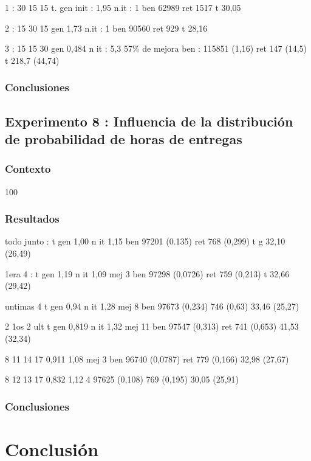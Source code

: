\documentclass{article}
\begin{document}
1 : 30 15 15
t. gen init : 1,95
n.it : 1
ben 62989
ret 1517
t 30,05

2 : 15 30 15
gen 1,73
n.it : 1
ben 90560
ret 929
t 28,16

3 : 15 15 30
gen 0,484
n it : 5,3
57\% de mejora
ben : 115851 (1,16)
ret 147 (14,5)
t 218,7 (44,74)

\subsubsection{Conclusiones}

\subsection{Experimento 8 : Influencia de la distribución de probabilidad
de horas de entregas}

\subsubsection{Contexto}
100

\subsubsection{Resultados}

todo junto :
t gen 1,00
n it 1,15
ben 97201 (0.135)
ret 768 (0,299)
t g 32,10 (26,49)

1era 4 :
t gen 1,19
n it 1,09
mej 3
ben 97298 (0,0726)
ret 759 (0,213)
t 32,66 (29,42)

untimas 4
t gen 0,94
n it 1,28
mej 8
ben 97673 (0,234)
746 (0,63)
33,46 (25,27)

2 1os 2 ult
t gen 0,819
n it 1,32
mej 11
ben 97547 (0,313)
ret 741 (0,653)
41,53 (32,34)

8 11 14 17
0,911
1,08
mej 3
ben 96740 (0,0787)
ret 779 (0,166)
32,98 (27,67)

8 12 13 17
0,832
1,12
4
97625 (0,108)
769 (0,195)
30,05 (25,91)

\subsubsection{Conclusiones}

\section*{Conclusión}
\end{document}
